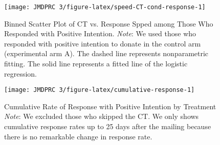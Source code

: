 \documentclass[12pt, a4paper]{article}
\begin{document}
\begin{figure}[H]
\texttt{[image: JMDPRC~3/figure-latex/speed-CT-cond-response-1]} \caption{Binned Scatter Plot of CT vs. Response Spped among Those Who Responded with Positive Intention. \newline \emph{Note}: We used those who responded with positive intention to donate in the control arm (experimental arm A). The dashed line represents nonparametric fitting. The solid line represents a fitted line of the logistic regression.}\label{fig:speed-CT-cond-response}
\end{figure}

\begin{figure}[t]
\texttt{[image: JMDPRC~3/figure-latex/cumulative-response-1]} \caption{Cumulative Rate of Response with Positive Intention by Treatment \newline \emph{Note}: We excluded those who skipped the CT. We only shows cumulative response rates up to 25 days after the mailing because there is no remarkable change in response rate.}\label{fig:cumulative-response}
\end{figure}
\end{document}
